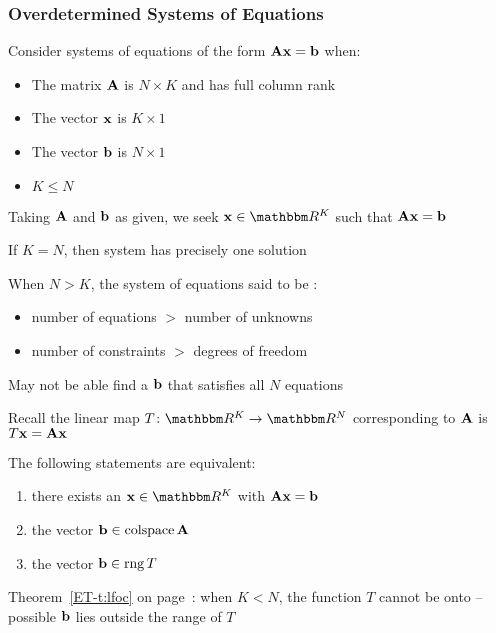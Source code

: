 \begin{frame}\frametitle{Overdetermined Systems of Equations}
    
    \vspace{2em}
    Consider systems of
    equations of the form $\mathbf A {\mathbf x} = {\mathbf b}$ when:
    \begin{itemize}
        \item The matrix $\mathbf A$ is
        $N \times K$ and has full column rank
        \item The vector ${\mathbf x}$ is $K\times1$
        \item The vector ${\mathbf b}$ is $N\times 1$ 
        \item $K\leq N$
    \end{itemize} 
    
    \vspace{1em}
    Taking $\mathbf A$ and ${\mathbf b}$ as given, we seek $\boldx \in \RR^K$ such that
    $\mathbf A {\mathbf x} = {\mathbf b}$

\end{frame}

\begin{frame}

     \vspace{2em}
    If $K = N$, then system has precisely one solution
    
    \vspace{1em}
    When $N > K$, the system of equations said to be :
    \begin{itemize}
        \item number of equations $>$ number of unknowns
        \item number of constraints $>$ degrees of freedom
    \end{itemize}
    
    May not be able find a ${\mathbf b}$ that satisfies all $N$ equations  
    
\end{frame}

\begin{frame}

     \vspace{2em}
    Recall  the linear map $T \colon
    \RR^K \to \RR^N$ corresponding to $\mathbf A$ is $T{\mathbf x} = \mathbf A {\mathbf x}$
    
    \vspace{1em}
    The following statements are equivalent:
    \begin{enumerate}
        \item there exists an $\boldx \in \RR^K$ with $\mathbf A {\mathbf x} = {\mathbf b}$
        \item the vector ${\mathbf b} \in \operatorname{colspace} \mathbf A$
        \item the vector ${\mathbf b} \in \operatorname{rng} T$
    \end{enumerate}
    
     \vspace{.7em}
    Theorem~\ref{ET-t:lfoc} on page~\pageref{ET-t:lfoc}: when $K <
    N$, the function $T$ cannot be onto -- possible ${\mathbf b}$ lies 
    outside the range of $T$
    
\end{frame}

